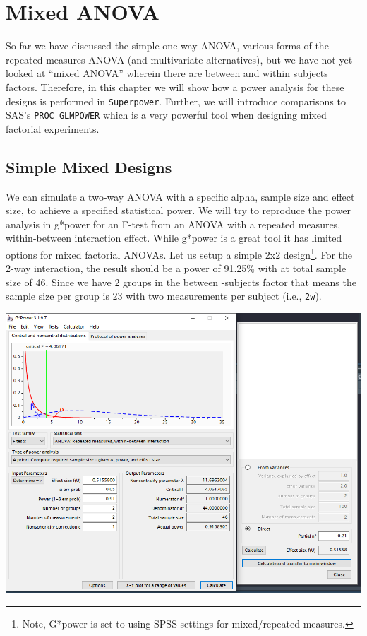 \documentclass[
]{book}
\begin{document}
\hypertarget{mixed-anova}{%
\chapter{Mixed ANOVA}\label{mixed-anova}}

So far we have discussed the simple one-way ANOVA, various forms of the repeated measures ANOVA (and multivariate alternatives), but we have not yet looked at ``mixed ANOVA'' wherein there are between and within subjects factors. Therefore, in this chapter we will show how a power analysis for these designs is performed in \texttt{Superpower}. Further, we will introduce comparisons to SAS's \texttt{PROC\ GLMPOWER} which is a very powerful tool when designing mixed factorial experiments.

\hypertarget{simple-mixed-designs}{%
\section{Simple Mixed Designs}\label{simple-mixed-designs}}

We can simulate a two-way ANOVA with a specific alpha, sample size and effect size, to achieve a specified statistical power. We will try to reproduce the power analysis in g*power \citep{faul2007g} for an F-test from an ANOVA with a repeated measures, within-between interaction effect. While g*power is a great tool it has limited options for mixed factorial ANOVAs.
\newpage 
Let us setup a simple 2x2 design\footnote{Note, G*power is set to using SPSS settings for mixed/repeated measures.}.
For the 2-way interaction, the result should be a power of 91.25\% with at total sample size of 46. Since we have 2 groups in the between -subjects factor that means the sample size per group is 23 with two measurements per subject (i.e., \texttt{2w}).

\includegraphics{screenshots/pes_cohenfu.png}
\newpage
\end{document}
